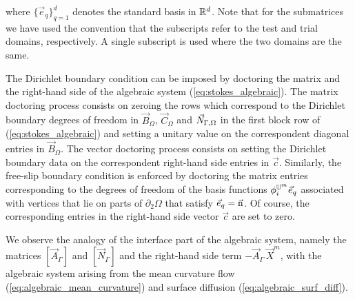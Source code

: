 where $\{\vec e_q\}_{q=1}^d$ denotes the standard basis in $\mathbb R^d$. Note that
for the submatrices we have used the convention that the subscripts refer to
the test and trial domains, respectively. A single subscript is used where the
two domains are the same.

The Dirichlet boundary condition can be imposed by doctoring the matrix and the
right-hand side of the algebraic system (\ref{eq:stokes_algebraic}). The matrix
doctoring process consists on zeroing the rows which correspond to the Dirichlet
boundary degrees of freedom in $\vec B_\Omega$, $\vec C_\Omega$ and $\vec{N}_{\Gamma,\Omega}$ in
the first block row of (\ref{eq:stokes_algebraic}) and setting a unitary value
on the correspondent diagonal entries in $\vec B_\Omega$. The vector doctoring
process consists on setting the Dirichlet boundary data on the correspondent
right-hand side entries in $\vec c$. Similarly, the free-slip boundary
condition is enforced by doctoring the matrix entries corresponding to
the degrees of freedom of the basis functions
$\phi_i^{\mathbb{U}^m}\vec e_q$ associated with vertices that lie on
parts of $\partial_2\Omega$ that satisfy $\vec e_q=\vec{\rm n}$. Of course,
the corresponding entries in the right-hand side vector $\vec c$ are set to
zero.

We observe the analogy of the interface part of the algebraic system,
namely the matrices $[\vec A_\Gamma]$ and $[\vec N_\Gamma]$ and the right-hand
side term $-\vec A_\Gamma\,\vec X^m$, with the algebraic system arising
from the mean curvature flow (\ref{eq:algebraic_mean_curvature}) and surface
diffusion (\ref{eq:algebraic_surf_diff}).

